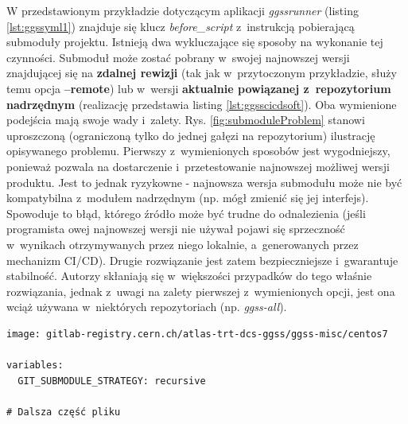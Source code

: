 W przedstawionym przykładzie dotyczącym aplikacji \textit{ggssrunner} (listing \ref{lst:ggssyml1}) znajduje się klucz \textit{before\_script} z~instrukcją pobierającą submoduły projektu. Istnieją dwa wykluczające się sposoby na wykonanie tej czynności. Submoduł może zostać pobrany w~swojej najnowszej wersji znajdującej się na \textbf{zdalnej rewizji} (tak jak w~przytoczonym przykładzie, służy temu opcja \textbf{--remote}) lub w~wersji \textbf{aktualnie powiązanej z~repozytorium nadrzędnym} (realizację przedstawia listing \ref{lst:ggsscicdsoft}). Oba wymienione podejścia mają swoje wady i~zalety. Rys. \ref{fig:submoduleProblem} stanowi uproszczoną (ograniczoną tylko do jednej gałęzi na repozytorium) ilustrację opisywanego problemu. Pierwszy z~wymienionych sposobów jest wygodniejszy, ponieważ pozwala na dostarczenie i~przetestowanie najnowszej możliwej wersji produktu. Jest to jednak ryzykowne - najnowsza wersja submodułu może nie być kompatybilna z~modułem nadrzędnym (np. mógł zmienić się jej interfejs). Spowoduje to błąd, którego źródło może być trudne do odnalezienia (jeśli programista owej najnowszej wersji nie używał pojawi się sprzeczność w~wynikach otrzymywanych przez niego lokalnie, a~generowanych przez mechanizm CI/CD). Drugie rozwiązanie jest zatem bezpieczniejsze i~gwarantuje stabilność. Autorzy skłaniają się w~większości przypadków do tego właśnie rozwiązania, jednak z~uwagi na zalety pierwszej z~wymienionych opcji, jest ona wciąż używana w~niektórych repozytoriach (np. \textit{ggss-all}). 

\begin{lstlisting}[caption={Fragment pliku \textit{.gitlab-ci.yml} znajdującego się w~repozytorium \textit{ggss-software-libs} pobierający submoduły projektu w~wersji aktualnie powiązanej z~repozytorium nadrzędnym}, label={lst:ggsscicdsoft}]
image: gitlab-registry.cern.ch/atlas-trt-dcs-ggss/ggss-misc/centos7

variables:
  GIT_SUBMODULE_STRATEGY: recursive

# Dalsza część pliku

\end{lstlisting}

